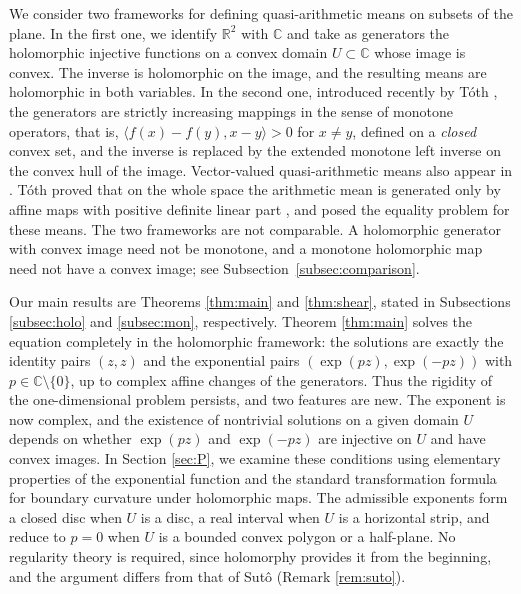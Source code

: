 \documentclass[a4paper, reqno, 11pt]{amsart}
\theoremstyle{definition}
\begin{document}
We consider two frameworks for defining quasi-arithmetic means on subsets of the plane. 
In the first one, we identify $\mathbb{R}^2$ with $\mathbb{C}$ and take as generators the holomorphic injective functions on a convex domain $U \subset \mathbb{C}$ whose image is convex. 
The inverse is holomorphic on the image, and the resulting means are holomorphic in both variables.
In the second one, introduced recently by T\'oth \cite{Toth}, the generators are strictly increasing mappings in the sense of monotone operators, that is, $\langle f(x) - f(y), x - y \rangle > 0$ for $x \neq y$, defined on a {\it closed} convex set, and the inverse is replaced by the extended monotone left inverse on the convex hull of the image. 
Vector-valued quasi-arithmetic means also appear in \cite{Leonetti, NielsenGSI}.
T\'oth proved that on the whole space the arithmetic mean is generated only by affine maps with positive definite linear part \cite[Theorem 4]{Toth}, and posed the equality problem for these means. 
The two frameworks are not comparable. 
A holomorphic generator with convex image need not be monotone, and a monotone holomorphic map need not have a convex image; see Subsection~\ref{subsec:comparison}.

Our main results are Theorems \ref{thm:main} and \ref{thm:shear}, stated in Subsections \ref{subsec:holo} and \ref{subsec:mon}, respectively.
Theorem \ref{thm:main} solves the equation completely in the holomorphic framework: the solutions are exactly the identity pairs $(z,z)$ and the exponential pairs $(\exp(pz), \exp(-pz))$ with $p \in \mathbb{C} \setminus \{0\}$, up to complex affine changes of the generators.
Thus the rigidity of the one-dimensional problem persists, and two features are new. 
The exponent is now complex, and the existence of nontrivial solutions on a given domain $U$ depends on whether $\exp(pz)$ and $\exp(-pz)$ are injective on $U$ and have convex images. 
In Section \ref{sec:P}, we examine these conditions using elementary properties of the exponential function and the standard transformation formula for boundary curvature under holomorphic maps. 
The admissible exponents form a closed disc when $U$ is a disc, a real interval when $U$ is a horizontal strip, and reduce to $p = 0$ when $U$ is a bounded convex polygon or a half-plane.
No regularity theory is required, since holomorphy provides it from the beginning, and the argument differs from that of Sut\^o (Remark \ref{rem:suto}).
\end{document}
